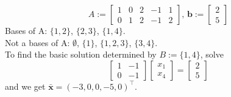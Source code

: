 \begin{exbox}
    \begin{example}[Bases of A]
        \[A:=
            \begin{bmatrix}
                1 & 0 & 2 & -1 & 1 \\
                0 & 1 & 2 & -1 & 2
            \end{bmatrix}
            \text{, }
            \bm{b}:=
            \begin{bmatrix}
                2 \\
                5
            \end{bmatrix}
        \]
        Bases of A: $\{1,2\}$, $\{2,3\}$, $\{1,4\}$.\\
        Not a bases of A: $\emptyset$, $\{1\}$, $\{1,2,3\}$, $\{3,4\}$.\\
        To find the basic solution determined by $B:=\{1,4\}$, solve
        \[
            \begin{bmatrix}
                1 & -1 \\
                0 & -1
            \end{bmatrix}
            \begin{bmatrix}
                x_1 \\
                x_4
            \end{bmatrix}
            =
            \begin{bmatrix}
                2 \\
                5
            \end{bmatrix}
        \]
        and we get $\bm{\bar{x}}=(-3,0,0,-5,0)^\top $.
    \end{example}
\end{exbox}
